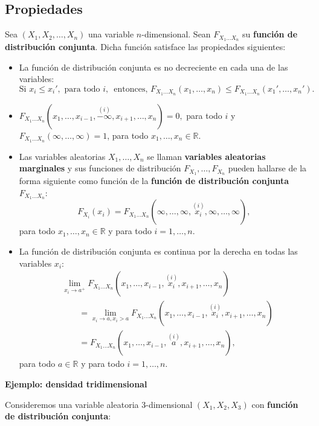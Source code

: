 \documentclass[
  letterpaper,
  DIV=11,
  numbers=noendperiod]{scrreprt}
\begin{document}
\hypertarget{propiedades-5}{%
\subsection{Propiedades}\label{propiedades-5}}

Sea \((X_1,X_2,\ldots,X_n)\) una variable \(n\)-dimensional. Sean
\(F_{X_1\ldots X_n}\) su \textbf{función de distribución conjunta}.
Dicha función satisface las propiedades siguientes:

\begin{itemize}
\item
  La función de distribución conjunta es no decreciente en cada una de
  las variables: \[
  \mbox{Si }x_i\leq x_i', \mbox{ para todo $i$, }\mbox{ entonces, }F_{X_1\ldots X_n}(x_1,\ldots,x_n)\leq F_{X_1\ldots X_n}(x_1',\ldots,x_n').
  \]
\item
  \(F_{X_1\ldots X_n}(x_1,\ldots,x_{i-1},\stackrel{(i)}{-\infty},x_{i+1},\ldots,x_n)=0,\)
  para todo \(i\) y \(F_{X_1\ldots X_n}(\infty,\ldots,\infty)=1\), para
  todo \(x_1,\ldots,x_n\in\mathbb{R}\).
\item
  Las variables aleatorias \(X_1,\ldots, X_n\) se llaman
  \textbf{variables aleatorias marginales} y sus funciones de
  distribución \(F_{X_1},\ldots, F_{X_n}\) pueden hallarse de la forma
  siguiente como función de la \textbf{función de distribución conjunta}
  \(F_{X_1\ldots X_n}\): \[
  F_{X_i}(x_i)=F_{X_1\ldots X_n}(\infty,\ldots,\infty,\stackrel{(i)}{x_i},\infty,\ldots,\infty),
  \] para todo \(x_1,\ldots,x_n\in\mathbb{R}\) y para todo
  \(i=1,\ldots,n\).
\item
  La función de distribución conjunta es continua por la derecha en
  todas las variables \(x_i\): \[
  \begin{array}{rl}
   & \lim\limits_{x_i\to a^+}F_{X_1\ldots X_n}(x_1,\ldots,x_{i-1},\stackrel{(i)}{x_i},x_{i+1},\ldots,x_n) \\ &\qquad =\lim\limits_{x_i\to a, x_i> a}F_{X_1\ldots X_n}(x_1,\ldots,x_{i-1},\stackrel{(i)}{x_i},x_{i+1},\ldots,x_n)\\ &\qquad =F_{X_1\ldots X_n}(x_1,\ldots,x_{i-1},\stackrel{(i)}{a},x_{i+1},\ldots,x_n),
  \end{array}
  \] para todo \(a\in\mathbb{R}\) y para todo \(i=1,\ldots,n\).
\end{itemize}

\textbf{Ejemplo: densidad tridimensional}

Consideremos una variable aleatoria \(3\)-dimensional \((X_1,X_2,X_3)\)
con \textbf{función de distribución conjunta}:
\end{document}

